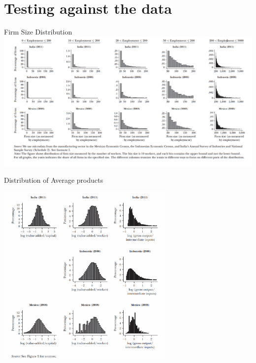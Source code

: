 \documentclass[usenames,dvipsnames,aspectratio=32]{beamer}
\begin{document}
\section{Testing against the data}
\begin{frame}{Firm Size Distribution}
    \includegraphics[width=\textwidth]{Figures/FirmSizeDist.png}
\end{frame}

\begin{frame}{Distribution of Average products}
\begin{center}
    \includegraphics[width=0.65\textwidth]{Figures/ReturnDistribution.png}
\end{center}
\end{frame}
\end{document}
